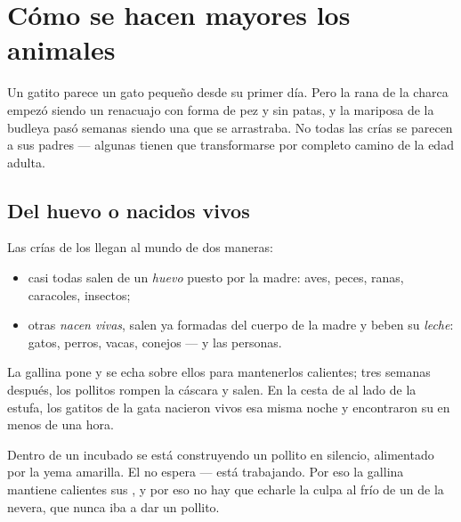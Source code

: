 \chapter{Cómo se hacen mayores los animales}\label{ch:g2:animals-grow-up}

Un gatito parece un gato pequeño desde su primer día. Pero la rana de
la charca empezó siendo un renacuajo con forma de pez y sin patas, y
la mariposa de la budleya pasó semanas siendo una  que se
arrastraba. No todas las crías se parecen a sus padres --- algunas
tienen que transformarse por completo camino de la edad adulta.

\section{Del huevo o nacidos vivos}

\begin{definition}\label{def:g2:animals-grow-up:born}
Las crías de los  llegan al mundo de dos maneras:
\begin{itemize}
  \item casi todas salen de un \emph{huevo} puesto por la
        madre: aves, peces, ranas, caracoles, insectos;
  \item otras \emph{nacen vivas}, salen ya formadas
        del cuerpo de la madre y beben su \emph{leche}:
        gatos, perros, vacas, conejos --- y las personas.
\end{itemize}
\end{definition}

\begin{example}\label{ex:g2:animals-grow-up:henhouse}
La gallina pone  y se echa sobre ellos para mantenerlos
calientes; tres semanas después, los pollitos rompen la cáscara y
salen. En la cesta de al lado de la estufa, los gatitos de la gata
nacieron vivos esa misma noche y encontraron su  en menos de una hora.
\end{example}

\begin{remark}\label{rem:g2:animals-grow-up:egg}
Dentro de un  incubado se está construyendo un pollito en
silencio, alimentado por la yema amarilla. El  no espera --- está
trabajando. Por eso la gallina mantiene calientes sus , y por
eso no hay que echarle la culpa al frío de un  de la nevera, que
nunca iba a dar un pollito.
\end{remark}

